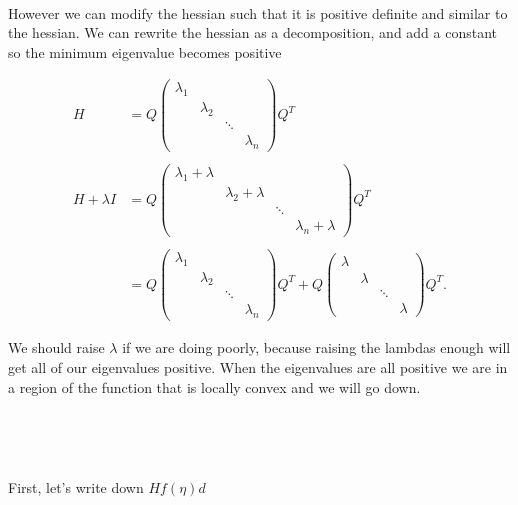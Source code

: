 \documentclass[]{article}
\begin{document}
~

However we can modify the hessian such that it is positive definite and
similar to the hessian. We can rewrite the hessian as a decomposition,
and add a constant so the minimum eigenvalue becomes positive

\begin{align*}
     H&= Q \begin{pmatrix}
     \lambda_1  & &  \\
     & \lambda_2 &  \\
     & & \ddots &  \\
       &  &  &\lambda_n
     \end{pmatrix} Q^T \\
     \\
     H + \lambda I &= Q \begin{pmatrix}
     \lambda_1 + \lambda  & &  \\
     & \lambda_2 + \lambda&  \\
     & & \ddots &  \\
       &  &  &\lambda_n +  \lambda
     \end{pmatrix} Q^T \\
     \\
     &= Q \begin{pmatrix}
     \lambda_1  & &  \\
     & \lambda_2 &  \\
     & & \ddots &  \\
       &  &  &\lambda_n
     \end{pmatrix} Q^T+
     Q \begin{pmatrix}
     \lambda  & &  \\
     & \lambda &  \\
     & & \ddots &  \\
       &  &  &\lambda
     \end{pmatrix} Q^T.
 \end{align*}

We should raise \(\lambda\) if we are doing poorly, because raising the
lambdas enough will get all of our eigenvalues positive. When the
eigenvalues are all positive we are in a region of the function that is
locally convex and we will go down.

~

~

First, let's write down \(Hf(\eta)d\)
\end{document}
